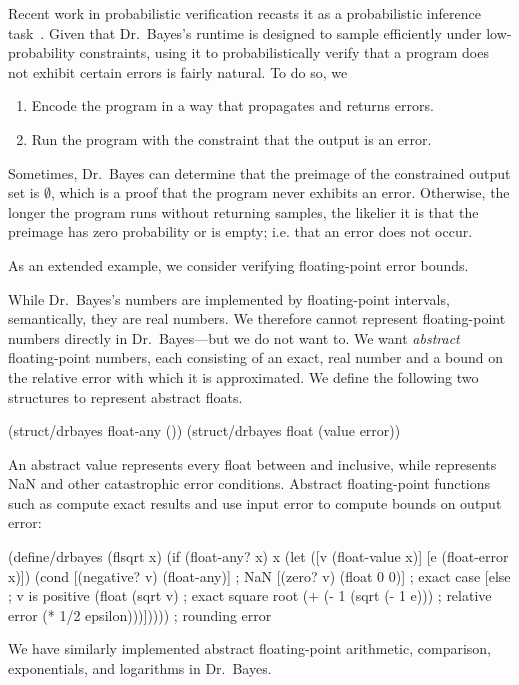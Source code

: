 \documentclass{llncs}
\begin{document}
Recent work in probabilistic verification recasts it as a probabilistic inference task~\cite{cit:gulwani-2007popl-prob-verify}.
Given that Dr.~Bayes's runtime is designed to sample efficiently under low-probability constraints, using it to probabilistically verify that a program does not exhibit certain errors is fairly natural.
To do so, we
\begin{enumerate}
	\item Encode the program in a way that propagates and returns errors.
	\item Run the program with the constraint that the output is an error.
\end{enumerate}
Sometimes, Dr.~Bayes can determine that the preimage of the constrained output set is $\emptyset$, which is a proof that the program never exhibits an error.
Otherwise, the longer the program runs without returning samples, the likelier it is that the preimage has zero probability or is empty; i.e. that an error does not occur.

As an extended example, we consider verifying floating-point error bounds.

While Dr.~Bayes's numbers are implemented by floating-point intervals, semantically, they are real numbers.
We therefore cannot represent floating-point numbers directly in Dr.~Bayes---but we do not want to.
We want \emph{abstract} floating-point numbers, each consisting of an exact, real number and a bound on the relative error with which it is approximated.
We define the following two structures to represent abstract floats.
\vspace{-0.5\baselineskip}
\begin{center}
\begin{schemedisplay}
(struct/drbayes float-any ())
(struct/drbayes float (value error))
\end{schemedisplay}
\end{center}
An abstract value  represents every float between  and  inclusive, while  represents NaN and other catastrophic error conditions.
Abstract floating-point functions such as  compute exact results and use input error to compute bounds on output error:
\vspace{-0.5\baselineskip}
\begin{center}
\begin{schemedisplay}
(define/drbayes (flsqrt x)
  (if (float-any? x)
      x
      (let ([v  (float-value x)]
            [e  (float-error x)])
        (cond [(negative? v)  (float-any)]  ; NaN
              [(zero? v)      (float 0 0)]  ; exact case
              [else  ; v is positive
               (float (sqrt v)                   ; exact square root
                      (+ (- 1 (sqrt (- 1 e)))    ; relative error
                         (* 1/2 epsilon)))]))))  ; rounding error
\end{schemedisplay}
\end{center}
We have similarly implemented abstract floating-point arithmetic, comparison, exponentials, and logarithms in Dr.~Bayes.
\end{document}
